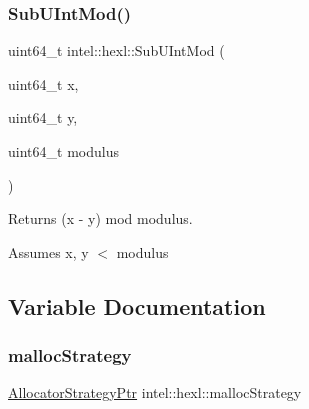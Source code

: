 \subsubsection{\texorpdfstring{Sub\+U\+Int\+Mod()}{SubUIntMod()}}
{\footnotesize\ttfamily uint64\+\_\+t intel\+::hexl\+::\+Sub\+U\+Int\+Mod (\begin{DoxyParamCaption}\item[{uint64\+\_\+t}]{x,  }\item[{uint64\+\_\+t}]{y,  }\item[{uint64\+\_\+t}]{modulus }\end{DoxyParamCaption})}



Returns (x -\/ y) mod modulus. 

Assumes x, y $<$ modulus 

\subsection{Variable Documentation}
\mbox{\label{namespaceintel_1_1hexl_aedc86b34ea92ac34d036acff6d84479a}} 
\subsubsection{\texorpdfstring{malloc\+Strategy}{mallocStrategy}}
{\footnotesize\ttfamily \hyperlink{namespaceintel_1_1hexl_aced64250965d3b78827d8009634eef0c}{Allocator\+Strategy\+Ptr} intel\+::hexl\+::malloc\+Strategy}

